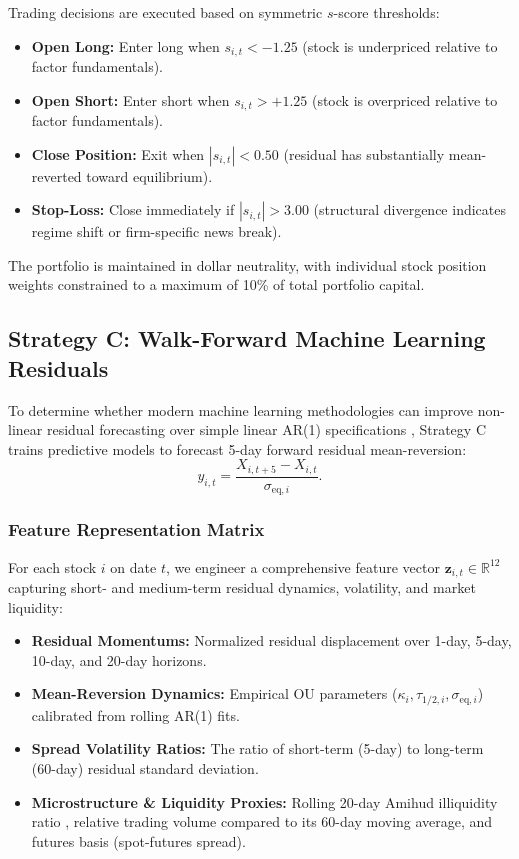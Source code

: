 \documentclass[11pt,a4paper]{article}
\begin{document}
Trading decisions are executed based on symmetric $s$-score thresholds:
\begin{itemize}
    \item \textbf{Open Long:} Enter long when $s_{i,t} < -1.25$ (stock is underpriced relative to factor fundamentals).
    \item \textbf{Open Short:} Enter short when $s_{i,t} > +1.25$ (stock is overpriced relative to factor fundamentals).
    \item \textbf{Close Position:} Exit when $|s_{i,t}| < 0.50$ (residual has substantially mean-reverted toward equilibrium).
    \item \textbf{Stop-Loss:} Close immediately if $|s_{i,t}| > 3.00$ (structural divergence indicates regime shift or firm-specific news break).
\end{itemize}
The portfolio is maintained in dollar neutrality, with individual stock position weights constrained to a maximum of 10\% of total portfolio capital.

\subsection{Strategy C: Walk-Forward Machine Learning Residuals}
To determine whether modern machine learning methodologies can improve non-linear residual forecasting over simple linear AR(1) specifications \citep{gu2020empirical,guijarro2021deep,lopezdeprado2018advances}, Strategy C trains predictive models to forecast 5-day forward residual mean-reversion:
\begin{equation}
    y_{i,t} = \frac{X_{i,t+5} - X_{i,t}}{\sigma_{\text{eq},i}}.
    \label{eq:ml_target}
\end{equation}

\subsubsection{Feature Representation Matrix}
For each stock $i$ on date $t$, we engineer a comprehensive feature vector $\mathbf{z}_{i,t} \in \mathbb{R}^{12}$ capturing short- and medium-term residual dynamics, volatility, and market liquidity:
\begin{itemize}
    \item \textbf{Residual Momentums:} Normalized residual displacement over 1-day, 5-day, 10-day, and 20-day horizons.
    \item \textbf{Mean-Reversion Dynamics:} Empirical OU parameters ($\kappa_i, \tau_{1/2, i}, \sigma_{\text{eq},i}$) calibrated from rolling AR(1) fits.
    \item \textbf{Spread Volatility Ratios:} The ratio of short-term (5-day) to long-term (60-day) residual standard deviation.
    \item \textbf{Microstructure \& Liquidity Proxies:} Rolling 20-day Amihud illiquidity ratio \citep{amihud2002illiquidity}, relative trading volume compared to its 60-day moving average, and futures basis (spot-futures spread).
\end{itemize}
\end{document}
